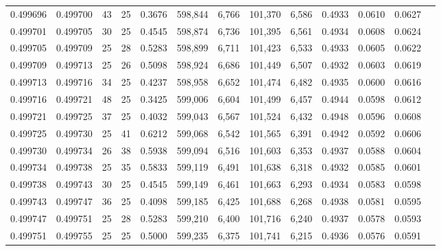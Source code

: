 \begin{tabular}{rrrrrrrrrrrrr}
0.499696 & 0.499700 &    43 &  25 &                                     0.3676 & 598,844 &   6,766 & 101,370 &   6,586 & 0.4933 & 0.0610 & 0.0627 \\
0.499701 & 0.499705 &    30 &  25 &                                     0.4545 & 598,874 &   6,736 & 101,395 &   6,561 & 0.4934 & 0.0608 & 0.0624 \\
0.499705 & 0.499709 &    25 &  28 &                                     0.5283 & 598,899 &   6,711 & 101,423 &   6,533 & 0.4933 & 0.0605 & 0.0622 \\
0.499709 & 0.499713 &    25 &  26 &                                     0.5098 & 598,924 &   6,686 & 101,449 &   6,507 & 0.4932 & 0.0603 & 0.0619 \\
0.499713 & 0.499716 &    34 &  25 &                                     0.4237 & 598,958 &   6,652 & 101,474 &   6,482 & 0.4935 & 0.0600 & 0.0616 \\
0.499716 & 0.499721 &    48 &  25 &                                     0.3425 & 599,006 &   6,604 & 101,499 &   6,457 & 0.4944 & 0.0598 & 0.0612 \\
0.499721 & 0.499725 &    37 &  25 &                                     0.4032 & 599,043 &   6,567 & 101,524 &   6,432 & 0.4948 & 0.0596 & 0.0608 \\
0.499725 & 0.499730 &    25 &  41 &                                     0.6212 & 599,068 &   6,542 & 101,565 &   6,391 & 0.4942 & 0.0592 & 0.0606 \\
0.499730 & 0.499734 &    26 &  38 &                                     0.5938 & 599,094 &   6,516 & 101,603 &   6,353 & 0.4937 & 0.0588 & 0.0604 \\
0.499734 & 0.499738 &    25 &  35 &                                     0.5833 & 599,119 &   6,491 & 101,638 &   6,318 & 0.4932 & 0.0585 & 0.0601 \\
0.499738 & 0.499743 &    30 &  25 &                                     0.4545 & 599,149 &   6,461 & 101,663 &   6,293 & 0.4934 & 0.0583 & 0.0598 \\
0.499743 & 0.499747 &    36 &  25 &                                     0.4098 & 599,185 &   6,425 & 101,688 &   6,268 & 0.4938 & 0.0581 & 0.0595 \\
0.499747 & 0.499751 &    25 &  28 &                                     0.5283 & 599,210 &   6,400 & 101,716 &   6,240 & 0.4937 & 0.0578 & 0.0593 \\
0.499751 & 0.499755 &    25 &  25 &                                     0.5000 & 599,235 &   6,375 & 101,741 &   6,215 & 0.4936 & 0.0576 & 0.0591 \\

\end{tabular}

